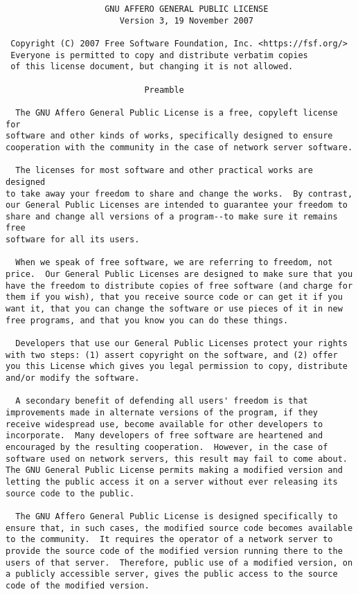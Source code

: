 \documentclass[11pt]{article}
\begin{document}
\begin{verbatim}
                    GNU AFFERO GENERAL PUBLIC LICENSE
                       Version 3, 19 November 2007

 Copyright (C) 2007 Free Software Foundation, Inc. <https://fsf.org/>
 Everyone is permitted to copy and distribute verbatim copies
 of this license document, but changing it is not allowed.

                            Preamble

  The GNU Affero General Public License is a free, copyleft license for
software and other kinds of works, specifically designed to ensure
cooperation with the community in the case of network server software.

  The licenses for most software and other practical works are designed
to take away your freedom to share and change the works.  By contrast,
our General Public Licenses are intended to guarantee your freedom to
share and change all versions of a program--to make sure it remains free
software for all its users.

  When we speak of free software, we are referring to freedom, not
price.  Our General Public Licenses are designed to make sure that you
have the freedom to distribute copies of free software (and charge for
them if you wish), that you receive source code or can get it if you
want it, that you can change the software or use pieces of it in new
free programs, and that you know you can do these things.

  Developers that use our General Public Licenses protect your rights
with two steps: (1) assert copyright on the software, and (2) offer
you this License which gives you legal permission to copy, distribute
and/or modify the software.

  A secondary benefit of defending all users' freedom is that
improvements made in alternate versions of the program, if they
receive widespread use, become available for other developers to
incorporate.  Many developers of free software are heartened and
encouraged by the resulting cooperation.  However, in the case of
software used on network servers, this result may fail to come about.
The GNU General Public License permits making a modified version and
letting the public access it on a server without ever releasing its
source code to the public.

  The GNU Affero General Public License is designed specifically to
ensure that, in such cases, the modified source code becomes available
to the community.  It requires the operator of a network server to
provide the source code of the modified version running there to the
users of that server.  Therefore, public use of a modified version, on
a publicly accessible server, gives the public access to the source
code of the modified version.


\end{verbatim}
\end{document}
